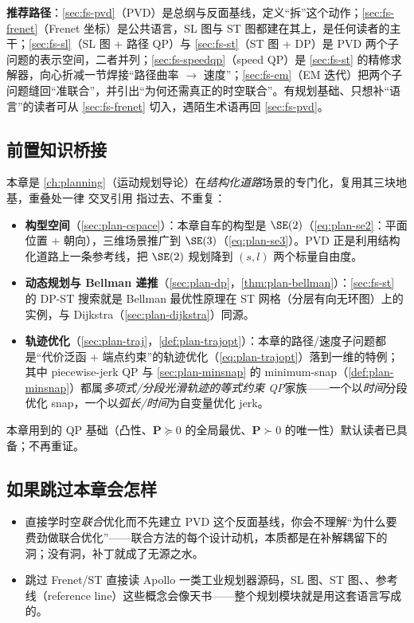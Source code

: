 \noindent\textbf{推荐路径}：\cref{sec:fs-pvd}（PVD）是总纲与反面基线，定义“拆”这个动作；\cref{sec:fs-frenet}（Frenet 坐标）是公共语言，SL 图与 ST 图都建在其上，是任何读者的主干；\cref{sec:fs-sl}（SL 图 + 路径 QP）与 \cref{sec:fs-st}（ST 图 + DP）是 PVD 两个子问题的表示空间，二者并列；\cref{sec:fs-speedqp}（speed QP）是 \cref{sec:fs-st} 的精修求解器，向心折减一节焊接“路径曲率 $\to$ 速度”；\cref{sec:fs-em}（EM 迭代）把两个子问题缝回“准联合”，并引出“为何还需真正的时空联合”。有规划基础、只想补“语言”的读者可从 \cref{sec:fs-frenet} 切入，遇陌生术语再回 \cref{sec:fs-pvd}。

\subsection*{前置知识桥接}
本章是 \cref{ch:planning}（运动规划导论）在\emph{结构化道路}场景的专门化，复用其三块地基，重叠处一律 交叉引用 指过去、不重复：
\begin{itemize}
  \item \textbf{构型空间}（\cref{sec:plan-cspace}）：本章自车的构型是 $\SE(2)$（\cref{eq:plan-se2}：平面位置 + 朝向），三维场景推广到 $\SE(3)$（\cref{eq:plan-se3}）。PVD 正是利用结构化道路上一条参考线，把 $\SE(2)$ 规划降到 $(s,l)$ 两个标量自由度。
  \item \textbf{动态规划与 Bellman 递推}（\cref{sec:plan-dp}，\cref{thm:plan-bellman}）：\cref{sec:fs-st} 的 DP-ST 搜索就是 Bellman 最优性原理在 ST 网格（分层有向无环图）上的实例，与 Dijkstra（\cref{sec:plan-dijkstra}）同源。
  \item \textbf{轨迹优化}（\cref{sec:plan-traj}，\cref{def:plan-trajopt}）：本章的路径/速度子问题都是“代价泛函 + 端点约束”的轨迹优化（\cref{eq:plan-trajopt}）落到一维的特例；其中 piecewise-jerk QP 与 \cref{sec:plan-minsnap} 的 minimum-snap（\cref{def:plan-minsnap}）都属\emph{多项式/分段光滑轨迹的等式约束 QP}家族——一个以\emph{时间}分段优化 snap，一个以\emph{弧长/时间}为自变量优化 jerk。
\end{itemize}
本章用到的 QP 基础（凸性、$\mathbf{P}\succeq0$ 的全局最优、$\mathbf{P}\succ0$ 的唯一性）默认读者已具备；不再重证。

\subsection*{如果跳过本章会怎样}
\begin{itemize}
  \item 直接学时空\emph{联合}优化而不先建立 PVD 这个反面基线，你会不理解“为什么要费劲做联合优化”——联合方法的每个设计动机，本质都是在补解耦留下的洞；没有洞，补丁就成了无源之水。
  \item 跳过 Frenet/ST 直接读 Apollo 一类工业规划器源码，SL 图、ST 图、\verb@STBoundary@、参考线（reference line）这些概念会像天书——整个规划模块就是用这套语言写成的。
\end{itemize}

